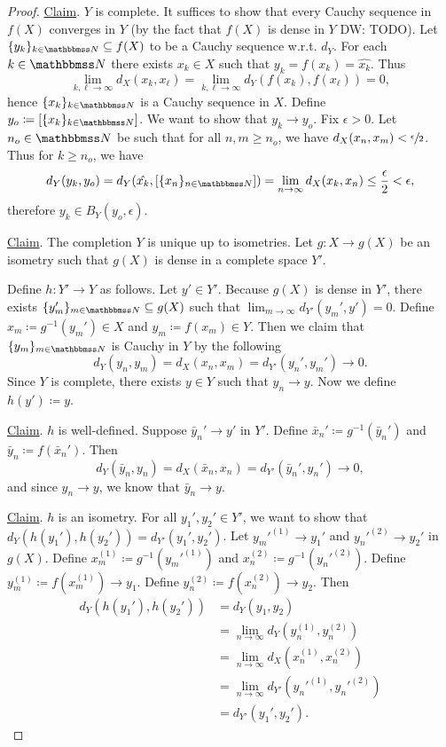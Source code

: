 \documentclass[screen,single]{techreport}
\numberwithin{equation}{section}
\newcommand{\diw}[1]{{\color{Red} DW: #1}}
\begin{document}
\begin{proof}
  \underline{Claim}. $Y$ is complete.
  It suffices to show that every Cauchy sequence in $f(X)$ converges in $Y$ (by the fact that $f(X)$ is dense in $Y$ \diw{TODO}).
  Let $\{ y_k\}_{k \in \bbN} \subseteq f(X)$ to be a Cauchy sequence w.r.t. $d_Y$.
  For each $k \in \bbN$ there exists $x_k \in X$ such that $y_k = f(x_k) = \hat{x_k}$.
  Thus
  \[
  \lim_{k,\ell \to \infty} d_X(x_k,x_\ell) = \lim_{k,\ell \to \infty} d_Y(f(x_k), f(x_\ell)) = 0,
  \]
  hence $\{x_k\}_{k \in \bbN}$ is a Cauchy sequence in $X$.
  Define $y_o \coloneqq [\{x_k\}_{k \in \bbN}]$.
  We want to show that $y_k \rightarrow y_o$.
  Fix $\epsilon > 0$.
  Let $n_o \in \bbN$ be such that for all $n,m \ge n_o$, we have $d_X(x_n,x_m) < \sfrac{\epsilon}{2}$.
  Thus for $k \ge n_o$, we have
  \[
  d_Y(y_k, y_o) = d_Y(\hat{x_k}, [\{x_n\}_{n \in \bbN}]) = \lim_{n \to \infty} d_X(x_k,x_n) \le \frac{\epsilon}{2} < \epsilon,
  \]
  therefore $y_k \in B_Y(y_o,\epsilon)$.
  
  \underline{Claim}. The completion $Y$ is unique up to isometries.
  Let $g : X \to g(X)$ be an isometry such that $g(X)$ is dense in a complete space $Y'$.
  
  Define $h : Y' \to Y$ as follows.
  Let $y' \in Y'$.
  Because $g(X)$ is dense in $Y'$, there exists $\{y_m'\}_{m \in \bbN} \subseteq g(X)$ such that $\lim_{m \to \infty} d_{Y'}(y_m',y') = 0$.
  Define $x_m \coloneqq g^{-1}(y_m') \in X$ and $y_m \coloneqq f(x_m) \in Y$.
  Then we claim that $\{y_m\}_{m \in \bbN}$ is Cauchy in $Y$ by the following
  \[
  d_Y(y_n,y_m) = d_X(x_n,x_m) = d_{Y'}(y_n',y_m') \rightarrow 0.
  \]
  Since $Y$ is complete, there exists $y \in Y$ such that $y_n \rightarrow y$.
  Now we define $h(y') \coloneqq y$.
  
  \underline{Claim}. $h$ is well-defined.
  Suppose $\bar{y}_n' \rightarrow y'$ in $Y'$.
  Define $\bar{x}_n' \coloneqq g^{-1}(\bar{y}_n')$ and $\bar{y}_n \coloneqq f(\bar{x}_n')$.
  Then
  \[
  d_Y(\bar{y}_n,y_n) = d_X(\bar{x}_n, x_n) = d_{Y'}(\bar{y}_n',y_n') \rightarrow 0,
  \]
  and since $y_n \rightarrow y$, we know that $\bar{y}_n \rightarrow y$.
  
  \underline{Claim}. $h$ is an isometry.
  For all $y_1',y_2' \in Y'$, we want to show that $d_Y(h(y_1'),h(y_2')) = d_{Y'}(y_1',y_2')$.
  Let $y_m'^{(1)} \rightarrow y_1'$ and $y_n'^{(2)} \rightarrow y_2'$ in $g(X)$.
  Define $x_m^{(1)} \coloneqq g^{-1}(y_m'^{(1)})$ and $x_n^{(2)} \coloneqq g^{-1}(y_n'^{(2)})$.
  Define $y_m^{(1)} \coloneqq f(x_m^{(1)}) \rightarrow y_1$.
  Define $y_n^{(2)} \coloneqq f(x_n^{(2)}) \rightarrow y_2$.
  Then
  \begin{align*}
    d_Y(h(y_1'), h(y_2')) & = d_Y(y_1,y_2) \\
    & = \lim_{n \to \infty} d_Y(y_n^{(1)},y_n^{(2)}) \\
    & = \lim_{n \to \infty} d_X(x_n^{(1)},x_n^{(2)}) \\
    & = \lim_{n \to \infty} d_{Y'}(y_n'^{(1)}, y_n'^{(2)}) \\
    & = d_{Y'}(y_1',y_2').
  \end{align*}
  

\end{proof}
\end{document}
